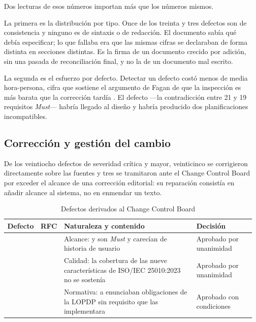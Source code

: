 \vspace{0.3cm}
\noindent
Dos lecturas de esos números importan más que los números mismos.

La primera es la distribución por tipo. Once de los treinta y tres defectos son de consistencia y
ninguno es de sintaxis o de redacción. El documento sabía qué debía especificar; lo que fallaba era
que las mismas cifras se declaraban de forma distinta en secciones distintas. Es la firma de un
documento crecido por adición, sin una pasada de reconciliación final, y no la de un documento mal
escrito.

La segunda es el esfuerzo por defecto. Detectar un defecto costó menos de media hora-persona, cifra
que sostiene el argumento de Fagan de que la inspección es más barata que la corrección tardía
\cite{fagan1976}. El defecto  ---la contradicción entre 21 y 19 requisitos \emph{Must}---
habría llegado al diseño y habría producido dos planificaciones incompatibles.

\subsection{Corrección y gestión del cambio}

De los veintiocho defectos de severidad crítica y mayor, veinticinco se corrigieron directamente
sobre las fuentes y tres se tramitaron ante el Change Control Board por exceder el alcance de una
corrección editorial: su reparación consistía en añadir alcance al sistema, no en enmendar un texto.

\begin{table}[H]
\centering\footnotesize
\caption{Defectos derivados al Change Control Board}
\label{tab:def-ccb}
\begin{tabular}{|C{1.6cm}|C{1.6cm}|L{5.4cm}|L{6.0cm}|}
\hline
{}\textbf{Defecto} & \textbf{RFC} & \textbf{Naturaleza y contenido} & \textbf{Decisión}\\ \hline
{} &  & Alcance:  y  son \emph{Must} y carecían de historia de usuario & Aprobado por unanimidad\\ \hline
{} &  & Calidad: la cobertura de las nueve características de ISO/IEC 25010:2023 no se sostenía & Aprobado por unanimidad\\ \hline
{} &  & Normativa:  a  enunciaban obligaciones de la LOPDP sin requisito que las implementara & Aprobado con condiciones\\ \hline
\end{tabular}
\end{table}

